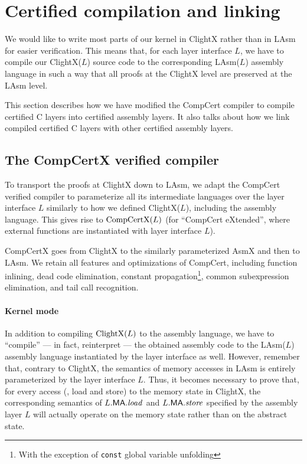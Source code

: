 \section{Certified compilation and linking}
\label{sec:seq:comp}

We would like to write most parts of our kernel in ClightX rather than
in LAsm for easier verification.  This means that, for
each layer interface $L$, we have to compile our ClightX($L$) source code to the
corresponding LAsm($L$) assembly language in such a way that all
proofs at the ClightX level are preserved at the LAsm
level.

This section describes how we have modified the CompCert compiler to
compile certified C layers into certified assembly layers. It also talks about
how we link compiled certified C layers with other certified assembly layers. 

\subsection{The CompCertX verified compiler}

To transport the proofs at ClightX down to LAsm, we adapt the CompCert
verified compiler to parameterize all
its intermediate languages over the layer interface $L$ similarly to
how we defined ClightX($L$), including the assembly language. This gives rise to
$\textrm{CompCertX(}L\textrm{)}$ (for ``CompCert eXtended'', where external functions
are instantiated with layer interface $L$).

CompCertX goes from ClightX to the similarly parameterized AsmX and
then to LAsm. We retain all features and optimizations of CompCert,
including function inlining, dead code elimination, 
constant
propagation\footnote{With the exception of \texttt{const} global
  variable unfolding},
common subexpression elimination, and tail call
recognition.


\paragraph{Kernel mode}

In addition to compiling $\textrm{ClightX(}L\textrm{)}$ to the assembly
language,  
we have to ``compile'' --- in fact, reinterpret
--- the obtained assembly code to the LAsm($L$) assembly language
instantiated by the layer interface as well. However, remember that, contrary to
ClightX, the semantics of memory accesses in LAsm is entirely
parameterized by the layer interface $L$. Thus, it becomes necessary to prove
that, for every access (\ie, load and store)
to the memory state in ClightX, the
corresponding semantics of $L.\textsf{MA}.\mathit{load}$ and
$L.\textsf{MA}.\mathit{store}$ specified by the assembly layer  $L$
will actually operate on the memory state rather than on the abstract
state.

